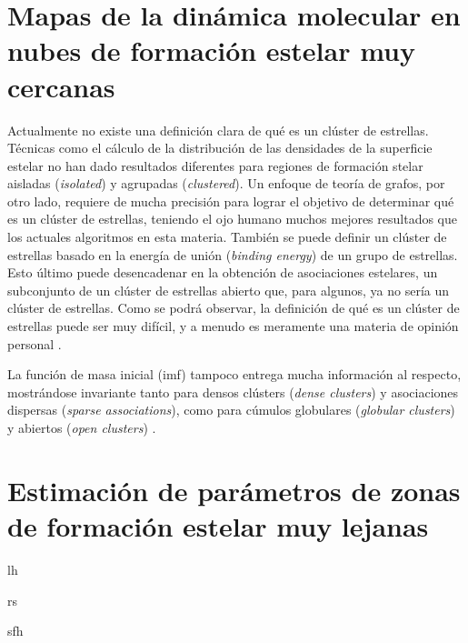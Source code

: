 \section{Mapas de la dinámica molecular en nubes de formación estelar muy cercanas}

Actualmente no existe una definición clara de qu\'e es un clúster de estrellas. T\'ecnicas como el cálculo de la distribución de las densidades de la superficie estelar no han dado resultados diferentes para regiones de formación stelar aisladas (\emph{isolated}) y agrupadas (\emph{clustered}). Un enfoque de teoría de grafos, por otro lado, requiere de mucha precisión para lograr el objetivo de determinar qu\'e es un clúster de estrellas, teniendo el ojo humano muchos mejores resultados que los actuales algoritmos en esta materia. Tambi\'en se puede definir un clúster de estrellas basado en la energía de unión (\emph{binding energy}) de un grupo de estrellas. Esto último puede desencadenar en la obtención de asociaciones estelares, un subconjunto de un clúster de estrellas abierto que, para algunos, ya no sería un clúster de estrellas. Como se podrá observar, la definición de qu\'e es un clúster de estrellas puede ser muy difícil, y a menudo es meramente una materia de opinión personal \cite{CSFreview}. 

La función de masa inicial (\gls{imf}) tampoco entrega mucha información al respecto, mostrándose invariante tanto para densos clústers (\emph{dense clusters}) y asociaciones dispersas (\emph{sparse associations}), como para cúmulos globulares (\emph{globular clusters}) y abiertos (\emph{open clusters}) \cite{CSFreview}.

\section{Estimación de parámetros de zonas de formación estelar muy lejanas}

\gls{lh}

\gls{rs}

\gls{sfh}
